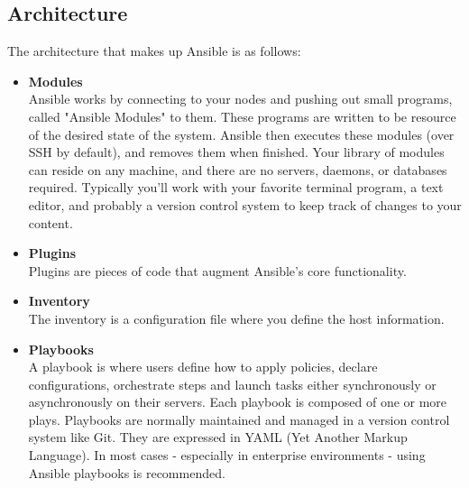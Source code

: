 \documentclass[a4paper, 12pt]{article}
\begin{document}
\subsection{Architecture}
The architecture that makes up Ansible is as follows:
\begin{itemize}
\item
\textbf{Modules}\\
Ansible works by connecting to your nodes and pushing out small programs, called "Ansible Modules" to them. These programs are written to be resource of the desired state of the system. Ansible then executes these modules (over SSH by default), and removes them when finished. Your library of modules can reside on any machine, and there are no servers, daemons, or databases required. Typically you'll work with your favorite terminal program, a text editor, and probably a version control system to keep track of changes to your content.
\item
\textbf{Plugins}\\
Plugins are pieces of code that augment Ansible's core functionality.
\item
\textbf{Inventory}\\
The inventory is a configuration file where you define the host information.
\item
\textbf{Playbooks}\\
A playbook is where users define how to apply policies, declare configurations, orchestrate steps and launch tasks either synchronously or asynchronously on their servers.  Each playbook is composed of one or more plays. Playbooks are normally maintained and managed in a version control system like Git. They are expressed in YAML (Yet Another Markup Language). In most cases - especially in enterprise environments - using Ansible playbooks is recommended.
\end{itemize}
\end{document}
